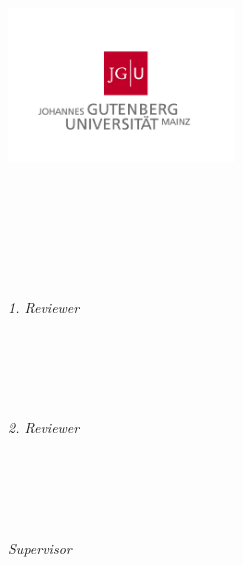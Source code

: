 \begin{titlepage}
	\tgherosfont
	\centering

	{\Large \thesisUniversity} \\[4mm]
	\includegraphics[width=6cm]{figures/JGU-Logo_farbe_high} \\[2mm]
	\textsf{\thesisUniversityDepartment} \\
	\textsf{\thesisUniversityInstitute} \\
	\textsf{\thesisUniversityGroup} \\

	\vfill
	{\large \thesisSubject} \\[5mm]
	{\LARGE \color{ctcolortitle}\textbf{\thesisTitle} \\[10mm]}
	{\Large \thesisName} \\

	\vfill
	\begin{minipage}[t]{.27\textwidth}
		\raggedleft
		\textit{1. Reviewer}
	\end{minipage}
	\hspace*{15pt}
	\begin{minipage}[t]{.65\textwidth}
		{\Large \thesisFirstReviewer} \\
	  	{\small \thesisFirstReviewerDepartment} \\[-1mm]
		{\small \thesisFirstReviewerUniversity}
	\end{minipage} \\[5mm]
	\begin{minipage}[t]{.27\textwidth}
		\raggedleft
		\textit{2. Reviewer}
	\end{minipage}
	\hspace*{15pt}
	\begin{minipage}[t]{.65\textwidth}
		{\Large \thesisSecondReviewer} \\
	  	{\small \thesisSecondReviewerDepartment} \\[-1mm]
		{\small \thesisSecondReviewerUniversity}
	\end{minipage} \\[10mm]
	\begin{minipage}[t]{.27\textwidth}
		\raggedleft
		\textit{Supervisor}
	\end{minipage}
	\hspace*{15pt}
	\begin{minipage}[t]{.65\textwidth}
		\thesisFirstSupervisor\ %
	\end{minipage} \\[10mm]

	\thesisDate \\

\end{titlepage}


